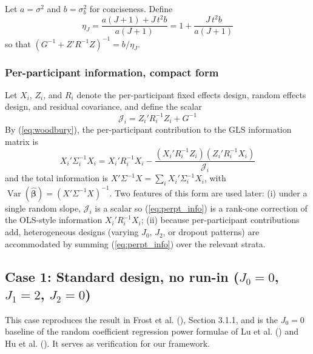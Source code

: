 \documentclass[
  11pt,
]{article}
\begin{document}
Let \(a = \sigma^2\) and \(b = \sigma_b^2\) for conciseness. Define
\begin{equation}
  \eta_J = \frac{a(J+1) + J\, t^2 b}{a(J+1)}
  = 1 + \frac{J\, t^2 b}{a(J+1)}
  \label{eq:eta}
\end{equation} so that \((G^{-1} + Z'R^{-1}Z)^{-1} = b / \eta_J\).

\subsubsection{Per-participant information, compact
form}\label{per-participant-information-compact-form}

Let \(X_i\), \(Z_i\), and \(R_i\) denote the per-participant fixed
effects design, random effects design, and residual covariance, and
define the scalar \begin{equation}
  \mathcal{J}_i
  = Z_i' R_i^{-1} Z_i + G^{-1}
  \label{eq:Ji}
\end{equation} By (\ref{eq:woodbury}), the per-participant contribution
to the GLS information matrix is \begin{equation}
  X_i' \Sigma_i^{-1} X_i
  = X_i' R_i^{-1} X_i
    - \frac{(X_i' R_i^{-1} Z_i)(Z_i' R_i^{-1} X_i)}
           {\mathcal{J}_i}
  \label{eq:perpt_info}
\end{equation} and the total information is \(X' \Sigma^{-1} X = \sum_i
X_i' \Sigma_i^{-1} X_i\), with
\(\mathop{\mathrm{Var}}(\hat{\boldsymbol{\beta}})
= (X' \Sigma^{-1} X)^{-1}\). Two features of this form are used later:
(i) under a single random slope, \(\mathcal{J}_i\) is a scalar so
(\ref{eq:perpt_info}) is a rank-one correction of the OLS-style
information \(X_i' R_i^{-1} X_i\); (ii) because per-participant
contributions add, heterogeneous designs (varying \(J_0\), \(J_2\), or
dropout patterns) are accommodated by summing (\ref{eq:perpt_info}) over
the relevant strata.

\subsection{\texorpdfstring{Case 1: Standard design, no run-in
(\(J_0=0\), \(J_1=2\),
\(J_2=0\))}{Case 1: Standard design, no run-in (J\_0=0, J\_1=2, J\_2=0)}}\label{case-1-standard-design-no-run-in-j_00-j_12-j_20}

This case reproduces the result in Frost et al.
(), Section 3.1.1,
and is the \(J_0 = 0\) baseline of the random coefficient regression
power formulae of Lu et al. () and Hu et al.
(). It serves as verification for our
framework.
\end{document}
